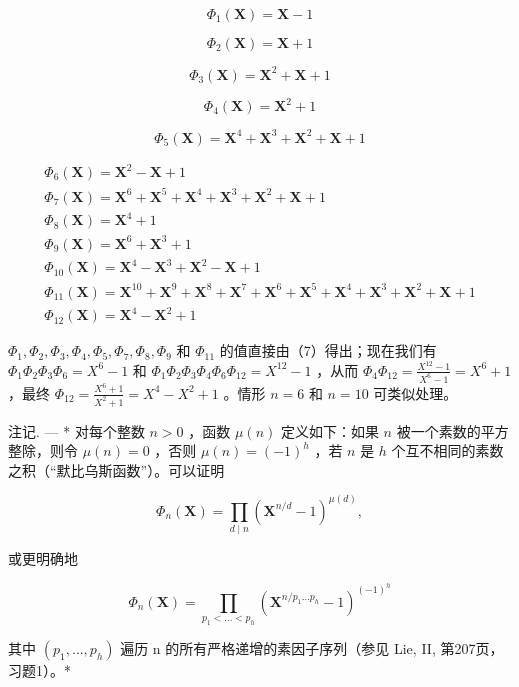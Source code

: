 \[
\Phi_ {1} (\mathbf {X}) = \mathbf {X} - 1
\]

\[
\Phi_ {2} (\mathbf {X}) = \mathbf {X} + 1
\]

\[
\Phi_ {3} (\mathbf {X}) = \mathbf {X} ^ {2} + \mathbf {X} + 1
\]

\[
\Phi_ {4} (\mathbf {X}) = \mathbf {X} ^ {2} + 1
\]

\[
\Phi_ {5} (\mathbf {X}) = \mathbf {X} ^ {4} + \mathbf {X} ^ {3} + \mathbf {X} ^ {2} + \mathbf {X} + 1
\]

\[
\begin{array}{l} \Phi_ {6} (\mathbf {X}) = \mathbf {X} ^ {2} - \mathbf {X} + 1 \\ \Phi_ {7} (\mathbf {X}) = \mathbf {X} ^ {6} + \mathbf {X} ^ {5} + \mathbf {X} ^ {4} + \mathbf {X} ^ {3} + \mathbf {X} ^ {2} + \mathbf {X} + 1 \\ \Phi_ {8} (\mathbf {X}) = \mathbf {X} ^ {4} + 1 \\ \Phi_ {9} (\mathbf {X}) = \mathbf {X} ^ {6} + \mathbf {X} ^ {3} + 1 \\ \Phi_ {1 0} (\mathbf {X}) = \mathbf {X} ^ {4} - \mathbf {X} ^ {3} + \mathbf {X} ^ {2} - \mathbf {X} + 1 \\ \Phi_ {1 1} (\mathbf {X}) = \mathbf {X} ^ {1 0} + \mathbf {X} ^ {9} + \mathbf {X} ^ {8} + \mathbf {X} ^ {7} + \mathbf {X} ^ {6} + \mathbf {X} ^ {5} + \mathbf {X} ^ {4} + \mathbf {X} ^ {3} + \mathbf {X} ^ {2} + \mathbf {X} + 1 \\ \Phi_ {1 2} (\mathbf {X}) = \mathbf {X} ^ {4} - \mathbf {X} ^ {2} + 1 \end{array}
\]

\(\Phi_1, \Phi_2, \Phi_3, \Phi_4, \Phi_5, \Phi_7, \Phi_8, \Phi_9\) 和 \(\Phi_{11}\) 的值直接由（7）得出；现在我们有 \(\Phi_1\Phi_2\Phi_3\Phi_6 = X^6 - 1\) 和 \(\Phi_1\Phi_2\Phi_3\Phi_4\Phi_6\Phi_{12} = X^{12} - 1\) ，从而 \(\Phi_4\Phi_{12} = \frac{X^{12} - 1}{X^6 - 1} = X^6 + 1\) ，最终 \(\Phi_{12} = \frac{X^6 + 1}{X^2 + 1} = X^4 - X^2 + 1\) 。情形 \(n = 6\) 和 \(n = 10\) 可类似处理。

注记. --- * 对每个整数 \(n>0\) ，函数 \(\mu(n)\) 定义如下：如果 \(n\) 被一个素数的平方整除，则令 \(\mu(n)=0\) ，否则 \(\mu(n)=(-1)^{h}\) ，若 \(n\) 是 \(h\) 个互不相同的素数之积（“默比乌斯函数”）。可以证明

\[
\Phi_ {n} (\mathbf {X}) = \prod_ {d \mid n} \left(\mathbf {X} ^ {n / d} - 1\right) ^ {\mu (d)},\tag{8}
\]

或更明确地

\[
\Phi_ {n} (\mathbf {X}) = \prod_ {p _ {1} <   \dots <   p _ {h}} \left(\mathbf {X} ^ {n / p _ {1} \dots p _ {h}} - 1\right) ^ {(- 1) ^ {h}}\tag{9}
\]

其中 \((p_{1},\ldots,p_{h})\) 遍历 n 的所有严格递增的素因子序列（参见 Lie, II, 第207页，习题1）。*

